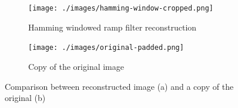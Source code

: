 \documentclass[12pt, a4paper]{article}
\begin{document}
	\begin{figure}[h]
		\centering
		\begin{subfigure}[t]{0.5\textwidth}
			\centering
			\texttt{[image: ./images/hamming-window-cropped.png]}
			\caption{Hamming windowed ramp filter reconstruction}
		\end{subfigure}%
		\begin{subfigure}[t]{0.5\textwidth}
			\centering
			\texttt{[image: ./images/original-padded.png]}
			\caption{Copy of the original image}
		\end{subfigure}
		\caption{Comparison between reconstructed image (a) and a copy of the original (b)}
		\label{fig:hamming-original}
	\end{figure}
	
\end{document}
